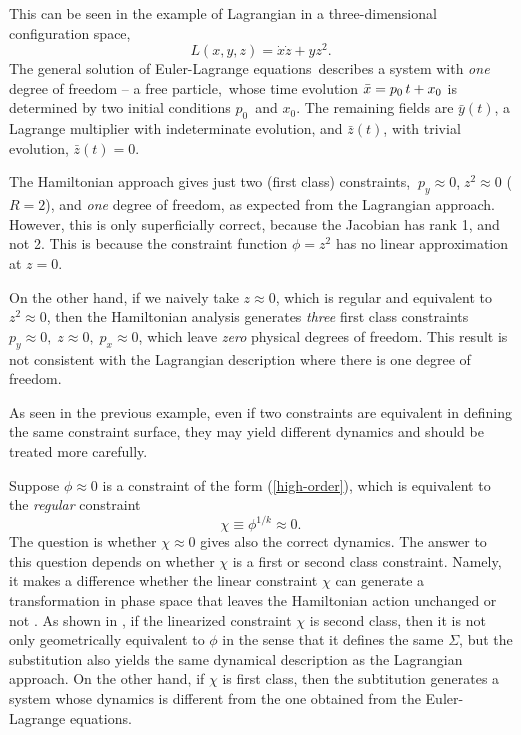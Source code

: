 \documentclass[a4paper,thmsa,11pt]{article}
\begin{document}
This can be seen in the example of Lagrangian in a three-dimensional
configuration space,
\begin{equation}
L\left( x,y,z\right) =\dot{x}\dot{z}+yz^{2}.  \label{three particles}
\end{equation}
The general solution of Euler-Lagrange equations\ describes a system with
\emph{one} degree of freedom -- a free particle,\ whose time evolution $\bar{%
x}=p_{0}\,t+x_{0}$ is determined by two initial conditions $p_{0}$\ and $%
x_{0}$. The remaining fields are $\bar{y}(t)$, a Lagrange multiplier with
indeterminate evolution, and $\bar{z}(t)$, with trivial evolution, $\bar{z}%
(t)=0$.

The Hamiltonian approach gives just two (first class) constraints, $\
p_{y}\approx 0$,$\;z^{2}\approx 0$ ($R=2$), and \emph{one} degree of
freedom, as expected from the Lagrangian approach. However, this is only
superficially correct, because the Jacobian has rank 1, and not 2. This is
because the constraint function $\phi =z^{2}$ has no linear approximation at
$z=0$.

On the other hand, if we naively take $z\approx 0$, which is regular and
equivalent to $z^{2}\approx 0$, then the Hamiltonian analysis generates
\emph{three} first class constraints $p_{y}\approx 0,\;z\approx
0,\;p_{x}\approx 0$, which leave \emph{zero} physical degrees of freedom.
This result is not consistent with the Lagrangian description where there is
one degree of freedom.

As seen in the previous example, even if two constraints are equivalent in
defining the same constraint surface, they may yield different dynamics and
should be treated more carefully.

Suppose $\phi \approx 0$ is a constraint of the form (\ref{high-order}),
which is equivalent to the \emph{regular} constraint
\begin{equation}
\chi \equiv \phi ^{1/k}\approx 0.
\end{equation}
The question is whether $\chi \approx 0$ gives also the correct dynamics.
The answer to this question depends on whether $\chi $ is a first or second
class constraint. Namely, it makes a difference whether the linear
constraint $\chi $ can generate a transformation in phase space that leaves
the Hamiltonian action unchanged or not . As shown in \cite{Miskovic-Zanelli}%
, if the linearized constraint $\chi $ is second class, then it is not only
geometrically equivalent to $\phi $ in the sense that it defines the same $%
\Sigma $, but the substitution also yields the same dynamical description as
the Lagrangian approach. On the other hand, if $\chi $ is first class, then
the subtitution generates a system whose dynamics is different from the one
obtained from the Euler-Lagrange equations.
\end{document}
